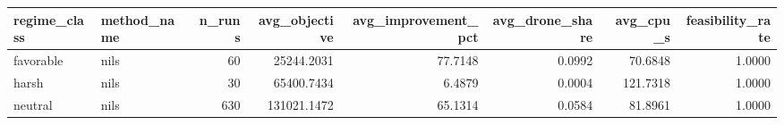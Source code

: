 \begin{tabular}{llrrrrrr}
\toprule
regime_class & method_name & n_runs & avg_objective & avg_improvement_pct & avg_drone_share & avg_cpu_s & feasibility_rate \\
\midrule
favorable & nils & 60 & 25244.2031 & 77.7148 & 0.0992 & 70.6848 & 1.0000 \\
harsh & nils & 30 & 65400.7434 & 6.4879 & 0.0004 & 121.7318 & 1.0000 \\
neutral & nils & 630 & 131021.1472 & 65.1314 & 0.0584 & 81.8961 & 1.0000 \\
\bottomrule
\end{tabular}
